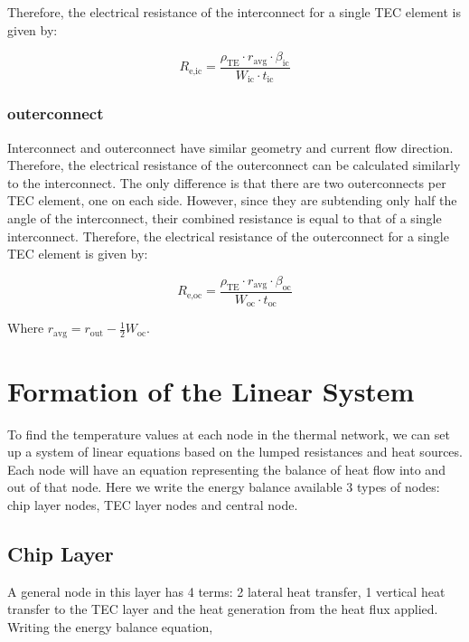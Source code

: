 \documentclass[10pt,a4paper,twocolumn]{article}
\begin{document}
Therefore, the electrical resistance of the interconnect for a single TEC element is given by:

\begin{equation}
  R_{\text{e,ic}} = \frac{\rho_{\text{TE}} \cdot r_{\text{avg}} \cdot \beta_{\text{ic}}}{W_{\text{ic}} \cdot t_{\text{ic}}}
\end{equation}

\subsubsection{outerconnect}

Interconnect and outerconnect have similar geometry and current flow direction. Therefore, the electrical resistance of the outerconnect can be calculated similarly to the interconnect. The only difference is that there are two outerconnects per TEC element, one on each side. However, since they are subtending only half the angle of the interconnect, their combined resistance is equal to that of a single interconnect. Therefore, the electrical resistance of the outerconnect for a single TEC element is given by:

\begin{equation}
  R_{\text{e,oc}} = \frac{\rho_{\text{TE}} \cdot r_{\text{avg}} \cdot \beta_{\text{oc}}}{W_{\text{oc}} \cdot t_{\text{oc}}}
\end{equation}

Where $r_{\text{avg}} = r_{\text{out}} - \frac{1}{2}W_{\text{oc}}$.

\section{Formation of the Linear System}

To find the temperature values at each node in the thermal network, we can set up a system of linear equations based on the lumped resistances and heat sources. Each node will have an equation representing the balance of heat flow into and out of that node. Here we write the energy balance available 3 types of nodes: chip layer nodes, TEC layer nodes and central node.

\subsection{Chip Layer}

A general node in this layer has 4 terms: 2 lateral heat transfer, 1 vertical heat transfer to the TEC layer and the heat generation from the heat flux applied. Writing the energy balance equation,
\end{document}
